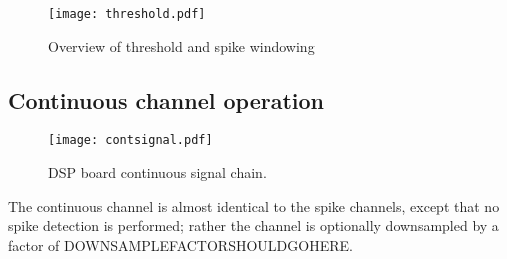 \begin{figure}
\texttt{[image: threshold.pdf]}
\caption{Overview of threshold and spike windowing}
\label{threshold}
\end{figure}

\subsection{Continuous channel operation}
\begin{figure}[h!]
\begin{center}
\texttt{[image: contsignal.pdf]}
\end{center}
\label{ConChain}
\caption{DSP board continuous signal chain.}
\end{figure}

The continuous channel is almost identical to the spike channels, except that no spike detection is performed; rather the channel is optionally downsampled by a factor of DOWNSAMPLEFACTORSHOULDGOHERE. 
